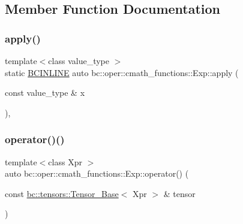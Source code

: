\subsection{Member Function Documentation}
\mbox{\label{structbc_1_1oper_1_1cmath__functions_1_1Exp_a327342717e1893787a1a339e85c397a7}} 
\subsubsection{\texorpdfstring{apply()}{apply()}}
{\footnotesize\ttfamily template$<$class value\+\_\+type $>$ \\
static \hyperlink{common_8h_a6699e8b0449da5c0fafb878e59c1d4b1}{B\+C\+I\+N\+L\+I\+NE} auto bc\+::oper\+::cmath\+\_\+functions\+::\+Exp\+::apply (\begin{DoxyParamCaption}\item[{const value\+\_\+type \&}]{x }\end{DoxyParamCaption})\hspace{0.3cm}{\ttfamily [inline]}, {\ttfamily [static]}}

\mbox{\label{structbc_1_1oper_1_1cmath__functions_1_1Exp_adfe01648f4169859035259f89e5d5286}} 
\subsubsection{\texorpdfstring{operator()()}{operator()()}\hspace{0.1cm}{\footnotesize\ttfamily [1/3]}}
{\footnotesize\ttfamily template$<$class Xpr $>$ \\
auto bc\+::oper\+::cmath\+\_\+functions\+::\+Exp\+::operator() (\begin{DoxyParamCaption}\item[{const \hyperlink{classbc_1_1tensors_1_1Tensor__Base}{bc\+::tensors\+::\+Tensor\+\_\+\+Base}$<$ Xpr $>$ \&}]{tensor }\end{DoxyParamCaption})\hspace{0.3cm}{\ttfamily [inline]}}

